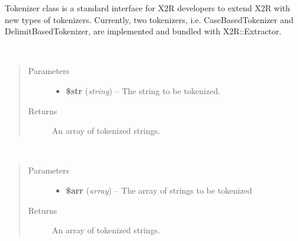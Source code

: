 \documentclass[letterpaper,10pt,english]{sphinxmanual}
\begin{document}
\begin{fulllineitems}
\label{docs/api:Tokenizer}
Tokenizer class is a standard interface for X2R developers to extend X2R with new types of tokenizers. Currently, two tokenizers, i.e. CaseBasedTokenizer and DelimitBasedTokenizer, are implemented and bundled with X2R::Extractor.

\begin{fulllineitems}
\label{docs/api:Tokenizer::tokenizeString}~\begin{quote}\begin{description}
\item[{Parameters}] \leavevmode\begin{itemize}
\item {} 
\textbf{\$str} (\emph{string}) -- The string to be tokenized.

\end{itemize}

\item[{Returns}] \leavevmode
An array of tokenized strings.

\end{description}\end{quote}

\end{fulllineitems}


\begin{fulllineitems}
\label{docs/api:Tokenizer::tokenizeArrayOfStrings}~\begin{quote}\begin{description}
\item[{Parameters}] \leavevmode\begin{itemize}
\item {} 
\textbf{\$arr} (\emph{array}) -- The array of strings to be tokenized

\end{itemize}

\item[{Returns}] \leavevmode
An array of tokenized strings.

\end{description}\end{quote}


\end{fulllineitems}
\end{fulllineitems}
\end{document}
